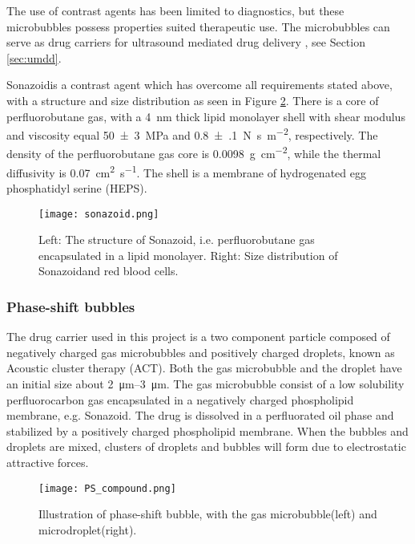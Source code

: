 The use of contrast agents has been limited to diagnostics, but these microbubbles possess properties suited therapeutic use. The microbubbles can serve as drug carriers for ultrasound mediated drug delivery \cite{Dijkmans2004}, see Section \ref{sec:umdd}.

Sonazoid\texttrademark is a contrast agent which has overcome all requirements stated above, with a structure and size distribution as seen in Figure \ref{Fig:Sonazoid}. There is a core of perfluorobutane gas, with a \SI{4}{\nano\meter} thick lipid monolayer shell with shear modulus and viscosity equal \SI{50(3)}{\mega\pascal} and \SI{0.8(1)}{\newton\second\per\meter\squared}, respectively\cite{Hoff2000}. The density of the perfluorobutane gas core is \SI{0.0098}{\gram\per\centi\meter\squared}, while the thermal diffusivity is \SI{0.07}{\centi\meter\squared\per\second}\cite{Healey2012}. The shell is a membrane of hydrogenated egg phosphatidyl serine (HEPS)\cite{Sontum2008}.

\begin{figure}[h]
  \centering
  \label{Fig:Sonazoid}
  \texttt{[image: sonazoid.png]}
  \caption{Left: The structure of Sonazoid\texttrademark , i.e. perfluorobutane gas encapsulated in a lipid monolayer. Right: Size distribution of Sonazoid\texttrademark and red blood cells\cite{Healey2012}.}
\end{figure}
 

\subsubsection{Phase-shift bubbles}
The drug carrier used in this project is a two component particle composed of negatively charged gas microbubbles and positively charged droplets, known as Acoustic cluster therapy (ACT). Both the gas microbubble and the droplet have an initial size about \SIrange{2}{3}{\micro\metre}. The gas microbubble consist of a low solubility perfluorocarbon gas encapsulated in a negatively charged phospholipid membrane, e.g. Sonazoid\texttrademark. The drug is dissolved in a perfluorated oil phase and stabilized by a positively charged phospholipid membrane. When the bubbles and droplets are mixed, clusters of droplets and bubbles will form due to electrostatic attractive forces.


\begin{figure}[h]
  \centering
  \label{Fig:Sonazoid}
  \texttt{[image: PS\_compound.png]}
  \caption{Illustration of phase-shift bubble, with the gas microbubble(left) and microdroplet(right).}
\end{figure}


